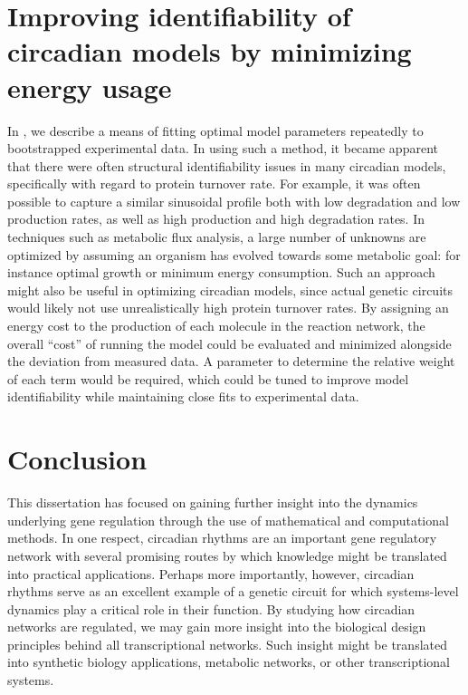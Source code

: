 \section{Improving identifiability of circadian models by minimizing energy usage}

In , we describe a means of fitting optimal model parameters repeatedly to bootstrapped experimental data.
In using such a method, it became apparent that there were often structural identifiability issues in many circadian models, specifically with regard to protein turnover rate.
For example, it was often possible to capture a similar sinusoidal profile both with low degradation and low production rates, as well as high production and high degradation rates.
In techniques such as metabolic flux analysis, a large number of unknowns are optimized by assuming an organism has evolved towards some metabolic goal: for instance optimal growth or minimum energy consumption.
Such an approach might also be useful in optimizing circadian models, since actual genetic circuits would likely not use unrealistically high protein turnover rates.
By assigning an energy cost to the production of each molecule in the reaction network, the overall ``cost'' of running the model could be evaluated and minimized alongside the deviation from measured data.
A parameter to determine the relative weight of each term would be required, which could be tuned to improve model identifiability while maintaining close fits to experimental data.

\section{Conclusion}

This dissertation has focused on gaining further insight into the dynamics underlying gene regulation through the use of mathematical and computational methods.
In one respect, circadian rhythms are an important gene regulatory network with several promising routes by which knowledge might be translated into practical applications.
Perhaps more importantly, however, circadian rhythms serve as an excellent example of a genetic circuit for which systems-level dynamics play a critical role in their function.
By studying how circadian networks are regulated, we may gain more insight into the biological design principles behind all transcriptional networks.
Such insight might be translated into synthetic biology applications, metabolic networks, or other transcriptional systems.

